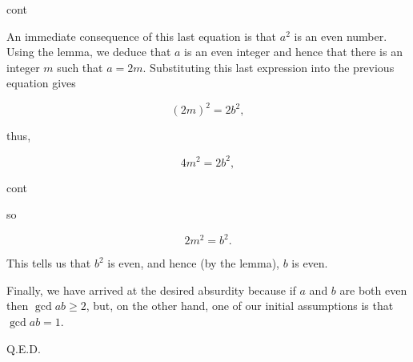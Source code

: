\documentclass[landscape]{beamer}
\begin{document}
\begin{frame}{cont}

An immediate consequence of this last equation is that $a^2$ is an
even number.  Using the lemma, we deduce that $a$ is an even
integer and hence that there is an integer $m$ such that $a=2m$.
Substituting this last expression into the previous equation gives

\begin{equation*}
(2m)^2 = 2 b^2,
\end{equation*}

thus,

\begin{equation*}
4m^2 = 2 b^2,
\end{equation*}

\end{frame}

\begin{frame}{cont}

so

\begin{equation*}
2m^2 = b^2.
\end{equation*}

This tells us that $b^2$ is even, and hence (by the lemma), $b$ is even.

Finally, we have arrived at the desired absurdity because if $a$ and
$b$ are both even then $\gcd{a}{b} \geq 2$, but, on the other hand,
one of our initial assumptions is that $\gcd{a}{b} = 1$. 

\rule{0pt}{0pt} \newline \rule{0pt}{15pt} \hfill Q.E.D.

\end{frame}
\end{document}
